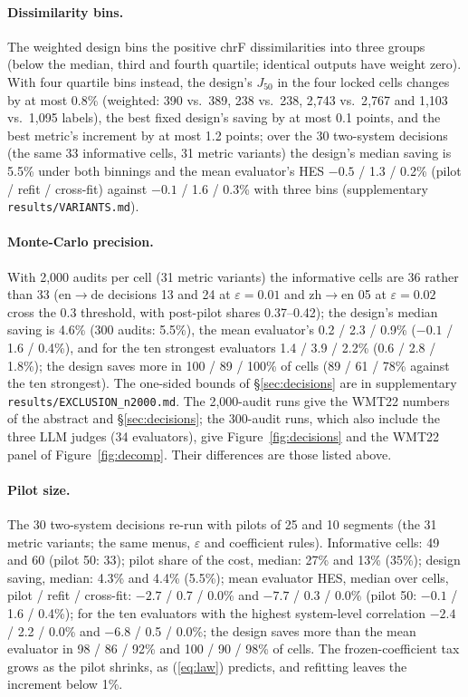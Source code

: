 \documentclass[11pt]{article}
\newcommand{\eps}{\varepsilon}
\newcommand{\Jt}{J_{50}}
\begin{document}
\paragraph{Dissimilarity bins.} The weighted design bins the positive chrF dissimilarities into three groups (below the
median, third and fourth quartile; identical outputs have weight zero). With four quartile bins instead, the design's
$\Jt$ in the four locked cells changes by at most 0.8\% (weighted: 390 vs.\ 389, 238 vs.\ 238, 2{,}743 vs.\ 2{,}767 and
1{,}103 vs.\ 1{,}095 labels), the best fixed design's saving by at most 0.1 points, and the best metric's increment by
at most 1.2 points; over the 30 two-system decisions (the same 33 informative cells, 31 metric variants) the design's
median saving is 5.5\% under both binnings and the mean evaluator's HES $-0.5$ / 1.3 / 0.2\% (pilot / refit / cross-fit)
against $-0.1$ / 1.6 / 0.3\% with three bins (supplementary \texttt{results/VARIANTS.md}).

\paragraph{Monte-Carlo precision.} With 2,000 audits per cell (31 metric variants) the informative cells are 36
rather than 33 (en$\to$de decisions 13 and 24 at $\eps=0.01$ and zh$\to$en 05 at $\eps=0.02$ cross the 0.3 threshold,
with post-pilot shares 0.37--0.42); the design's median saving is 4.6\% (300 audits: 5.5\%), the mean evaluator's
0.2 / 2.3 / 0.9\% ($-0.1$ / 1.6 / 0.4\%), and for the ten strongest evaluators 1.4 / 3.9 / 2.2\% (0.6 / 2.8 / 1.8\%); the
design saves more in 100 / 89 / 100\% of cells (89 / 61 / 78\% against the ten strongest). The one-sided bounds of
\S\ref{sec:decisions} are in supplementary \texttt{results/EXCLUSION\_n2000.md}. The 2,000-audit runs give the WMT22
numbers of the abstract and \S\ref{sec:decisions}; the 300-audit runs, which also include the three LLM judges (34
evaluators), give Figure~\ref{fig:decisions} and the WMT22 panel of Figure~\ref{fig:decomp}. Their differences are
those listed above.

\paragraph{Pilot size.} The 30 two-system decisions re-run with pilots of 25 and 10 segments (the 31 metric
variants; the same menus, $\eps$ and coefficient rules). Informative cells: 49 and 60 (pilot 50: 33); pilot share of the
cost, median: 27\% and 13\% (35\%); design saving, median: 4.3\% and 4.4\% (5.5\%); mean evaluator HES, median over
cells, pilot / refit / cross-fit: $-2.7$ / 0.7 / 0.0\% and $-7.7$ / 0.3 / 0.0\% (pilot 50: $-0.1$ / 1.6 / 0.4\%); for the
ten evaluators with the highest system-level correlation $-2.4$ / 2.2 / 0.0\% and $-6.8$ / 0.5 / 0.0\%; the design saves
more than the mean evaluator in 98 / 86 / 92\% and 100 / 90 / 98\% of cells. The frozen-coefficient tax grows as the
pilot shrinks, as (\ref{eq:law}) predicts, and refitting leaves the increment below 1\%.
\end{document}
